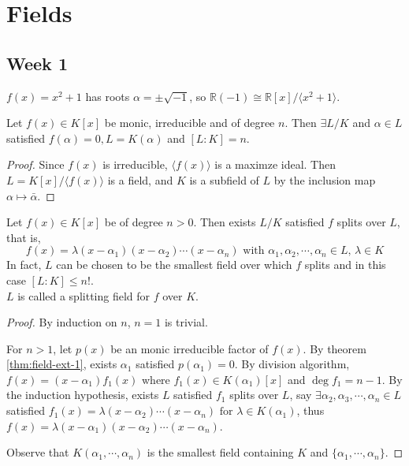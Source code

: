 \section{Fields}

\subsection{Week 1}

\begin{example}
  $f(x) = x^2 + 1$ has roots $\alpha = \pm \sqrt{-1}$, so $\mathbb{R}(-1) \cong \mathbb{R}[x] / \langle x^2 + 1 \rangle$.
\end{example}

\begin{theorem} \label{thm:field-ext-1}
  Let $f(x) \in K[x]$ be monic, irreducible and of degree $n$. Then $\exists L / K$ and $\alpha \in L$
  satisfied $f(\alpha) = 0, L = K(\alpha)$ and $[L: K] = n$.
\end{theorem}

\begin{proof}
  Since $f(x)$ is irreducible, $\langle f(x) \rangle$ is a maximze ideal.
  Then $L = K[x] / \langle f(x) \rangle$ is a field, and $K$ is a subfield
  of $L$ by the inclusion map $\alpha \mapsto \bar\alpha$.
\end{proof}

\begin{theorem}
  Let $f(x) \in K[x]$ be of degree $n > 0$. Then exists $L/K$ satisfied $f$ splits over $L$,
  that is,
  \[ f(x) = \lambda (x - \alpha_1) (x - \alpha_2) \cdots (x - \alpha_n) \text{ with }
    \alpha_1, \alpha_2, \cdots, \alpha_n \in L,\, \lambda \in K \]
  In fact, $L$ can be chosen to be the smallest field over which $f$ splits and in this case $[L : K] \leq n!$.\\
  $L$ is called a splitting field for $f$ over $K$.
\end{theorem}

\begin{proof}
  By induction on $n$, $n = 1$ is trivial.

  For $n > 1$, let $p(x)$ be an monic irreducible factor of $f(x)$.
  By theorem \ref{thm:field-ext-1}, exists $\alpha_1$ satisfied $p(\alpha_1) = 0$.
  By division algorithm, $f(x) = (x - \alpha_1) f_1(x)$ where $f_1(x) \in K(\alpha_1)[x]$
  and $\deg f_1 = n - 1$. By the induction hypothesis, exists $L$ satisfied $f_1$
  splits over $L$, say $\exists \alpha_2, \alpha_3, \cdots, \alpha_n \in L$ satisfied
  $ f_1(x) = \lambda (x - \alpha_2) \cdots (x - \alpha_n) \text{ for } \lambda  \in K(\alpha_1) $,
  thus $f(x) = \lambda (x - \alpha_1) (x - \alpha_2) \cdots (x - \alpha_n)$.

  Observe that $K(\alpha_1, \cdots, \alpha_n)$ is the smallest field containing $K$ and
  $\{ \alpha_1, \cdots, \alpha_n\}$.
\end{proof}

